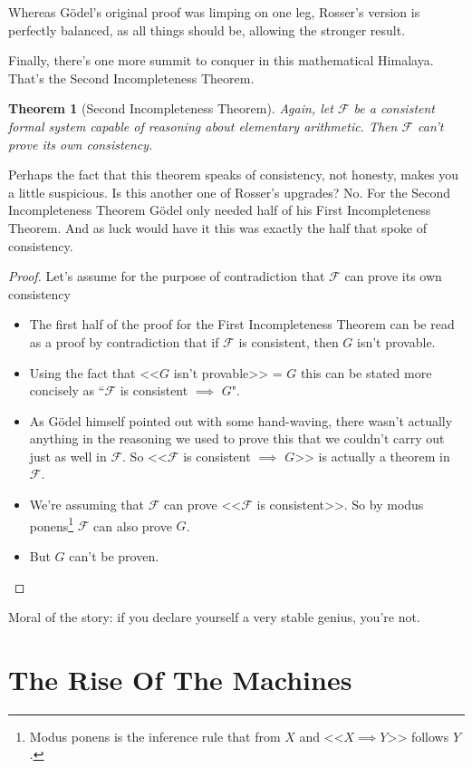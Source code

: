 \documentclass{article}
\theoremstyle{theorem}
\newtheorem{theorem}{Theorem}
\newcommand{\impl}{\item[$\Rightarrow$]}
\begin{document}
Whereas Gödel's original proof was limping on one leg, Rosser's version is perfectly balanced, as all things should be, allowing the stronger result.

Finally, there's one more summit to conquer in this mathematical Himalaya. That's the Second Incompleteness Theorem.

\begin{theorem}[Second Incompleteness Theorem]
Again, let $\mathcal{F}$ be a consistent formal system capable of reasoning about elementary arithmetic. Then $\mathcal{F}$ can't prove its own consistency.
\end{theorem}

Perhaps the fact that this theorem speaks of consistency, not honesty, makes you a little suspicious. Is this another one of Rosser's upgrades? No. For the Second Incompleteness Theorem Gödel only needed half of his First Incompleteness Theorem. And as luck would have it this was exactly the half that spoke of consistency.

\begin{proof}
Let's assume for the purpose of contradiction that $\mathcal{F}$ can prove its own consistency
\begin{itemize}
\impl The first half of the proof for the First Incompleteness Theorem can be read as a proof by contradiction that if $\mathcal{F}$ is consistent, then $G$ isn't provable.
\impl Using the fact that <<$G$ isn't provable>> = $G$ this can be stated more concisely as ``$\mathcal{F}$ is consistent $\implies$ $G$".
\impl As Gödel himself pointed out with some hand-waving, there wasn't actually anything in the reasoning we used to prove this that we couldn't carry out just as well in $\mathcal{F}$. So <<$\mathcal{F}$ is consistent $\implies$ $G$>> is actually a theorem in $\mathcal{F}$.
\impl We're assuming that $\mathcal{F}$ can prove <<$\mathcal{F}$ is consistent>>. So by modus ponens\footnote{Modus ponens is the inference rule that from $X$ and <<$X \implies Y$>> follows $Y$.} $\mathcal{F}$ can also prove $G$.
\impl But $G$ can't be proven. \lightning
\end{itemize}
\end{proof}

Moral of the story: if you declare yourself a very stable genius, you're not.\cite{trump}

\section{The Rise Of The Machines}
\end{document}
